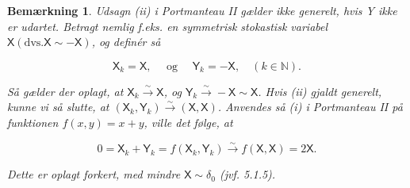 \documentclass{article}
\newcommand{\1}{\mathbbm{1}}
\newcommand{\X}{\mathsf{X}}
\newcommand{\Y}{\mathsf{Y}}
\theoremstyle{boxed}
\newtheorem{remark}[theorem]{Bemærkning}
\begin{document}
\begin{remark}
    Udsagn (ii) i Portmanteau II gælder ikke generelt, hvis Y ikke er udartet.
Betragt nemlig f.eks. en symmetrisk stokastisk variabel $\X(\mathrm{dvs} . \X \sim-\X)$, og definér så

$$
\X_k=\X, \quad \text { og } \quad \Y_k=-\X, \quad(k \in \mathbb{N}) .
$$


Så gælder der oplagt, at $\X_k \xrightarrow{\sim} \X$, og $\Y_k \xrightarrow{\sim}-\X \sim \X$.
Hvis (ii) gjaldt generelt, kunne vi så slutte, at $\left(\X_k, \Y_k\right) \xrightarrow{\sim}(\X, \X)$.
Anvendes så (i) i Portmanteau II på funktionen $f(x, y)=x+y$, ville det følge, at

$$
0=\X_k+\Y_k=f\left(\X_k, \Y_k\right) \xrightarrow{\sim} f(\X, \X)=2 \X .
$$


Dette er oplagt forkert, med mindre $\X \sim \delta_0$ (jvf. 5.1.5).
\end{remark}
\end{document}
